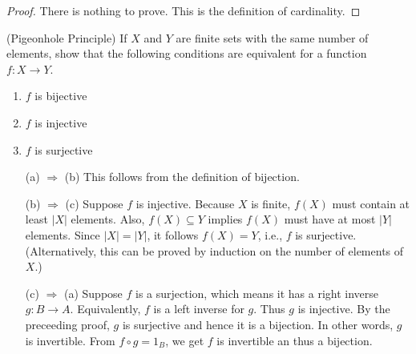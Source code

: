 \begin{questions}
\begin{proof} There is nothing to prove. This is the definition of cardinality. 
\end{proof}


\question
    (Pigeonhole Principle)
    If \(X\) and \(Y\) are finite sets with the same number of elements, show that the following conditions are equivalent for a function \(f\colon X \rightarrow Y\).
    \begin{enumerate}[label=(\alph*)]
        \item \(f\) is bijective
        \item \(f\) is injective
        \item \(f\) is surjective
    \end{enumerate}
\begin{theproof} \hfill
\begin{itemize}[left=0.7in]
    \item[(a) \(\Rightarrow\) (b)] This follows from the definition of bijection.
    
    \item[(b) \(\Rightarrow\) (c)] Suppose \(f\) is injective. 
    Because \(X\) is finite, \(f(X)\) must contain at least \(|X|\) elements. Also, \(f(X)\subseteq Y\) implies \(f(X)\) must have  at most \(|Y|\) elements. Since \(|X| = |Y|\), it follows  \(f(X) = Y\), i.e., \(f\) is surjective.
    (Alternatively, this can be proved by induction on the number of elements of \(X\).)
    
    \item[(c) \(\Rightarrow\) (a)] Suppose \(f\) is a surjection, which means it has a right inverse \(g\colon B\to A\). 
    Equivalently,  \(f\) is a left inverse for \(g\). 
    Thus \(g\) is injective. By the preceeding proof, \(g\) is surjective and hence it is a bijection. In other words, \(g\) is invertible.
    From \(f\circ g = 1_B\), we get \(f\)  is invertible an thus a bijection.
\end{itemize}


\end{theproof}
\end{questions}
